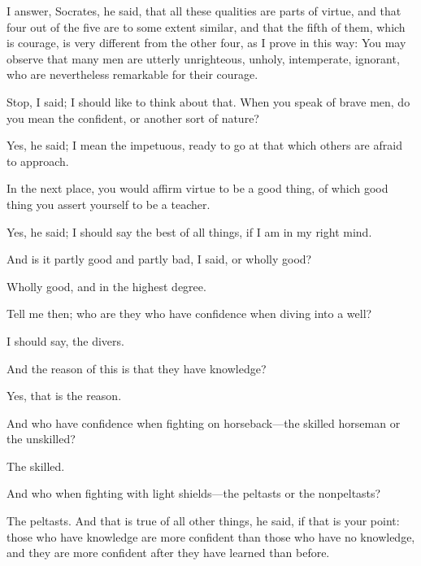 \documentclass[11pt,letter]{article}
\begin{document}
\par  I answer, Socrates, he said, that all these qualities are parts of virtue, and that four out of the five are to some extent similar, and that the fifth of them, which is courage, is very different from the other four, as I prove in this way: You may observe that many men are utterly unrighteous, unholy, intemperate, ignorant, who are nevertheless remarkable for their courage.

\par  Stop, I said; I should like to think about that. When you speak of brave men, do you mean the confident, or another sort of nature?

\par  Yes, he said; I mean the impetuous, ready to go at that which others are afraid to approach.

\par  In the next place, you would affirm virtue to be a good thing, of which good thing you assert yourself to be a teacher.

\par  Yes, he said; I should say the best of all things, if I am in my right mind.

\par  And is it partly good and partly bad, I said, or wholly good?

\par  Wholly good, and in the highest degree.

\par  Tell me then; who are they who have confidence when diving into a well?

\par  I should say, the divers.

\par  And the reason of this is that they have knowledge?

\par  Yes, that is the reason.

\par  And who have confidence when fighting on horseback—the skilled horseman or the unskilled?

\par  The skilled.

\par  And who when fighting with light shields—the peltasts or the nonpeltasts?

\par  The peltasts. And that is true of all other things, he said, if that is your point: those who have knowledge are more confident than those who have no knowledge, and they are more confident after they have learned than before.
\end{document}
